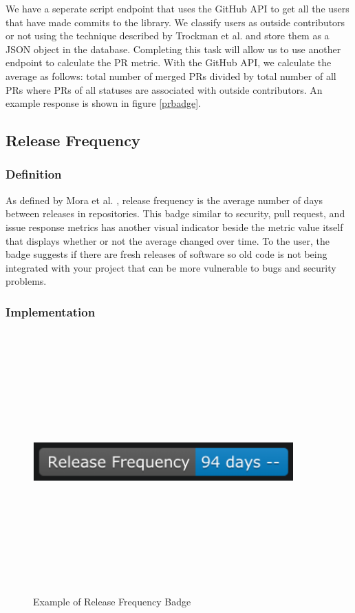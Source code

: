 \documentclass[12pt, letterpaper]{article}
\begin{document}
We have a seperate script endpoint that uses the GitHub \cite{github} API to get all the users
that have made commits to the library. We classify users as outside contributors or not using
the technique described by Trockman et al. \cite{githubbadges} and store them as a JSON object in the database.
Completing this task will allow us to use another endpoint to calculate the PR metric.
With the GitHub \cite{github} API, we calculate
the average as follows: total number of merged PRs divided by total number of all PRs where 
PRs of all statuses are associated with outside contributors. An example response is shown in figure \ref{prbadge}.


\subsection{Release Frequency}
\subsubsection{Definition}
As defined by Mora et al. \cite{metrics}, release frequency is the average number of days between
releases in repositories. This badge similar to security, pull request, and issue response metrics has 
another visual indicator beside the metric value itself that displays whether or not the average changed over time. 
To the user, the badge suggests if there are fresh releases of software so old code is not being integrated with your
project that can be more vulnerable to bugs and security problems.

\subsubsection{Implementation}

\begin{figure}[!htb]
    \centerline{
        \includegraphics[width=10cm,height=10cm,keepaspectratio=true]{releasebadge}
    }
    \caption{
        Example of Release Frequency Badge
    }
    \label{releasebadge}
\end{figure}
\end{document}
